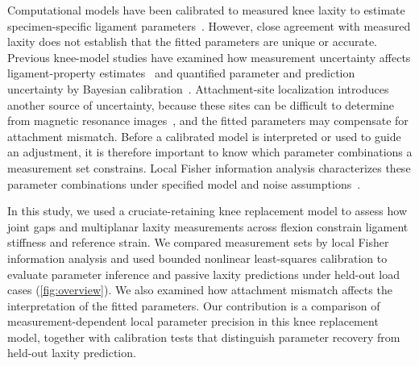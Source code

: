 Computational models have been calibrated to measured knee laxity to estimate specimen-specific ligament parameters~\autocite{harris2016combined,ewing2016estimating}.
However, close agreement with measured laxity does not establish that the fitted parameters are unique or accurate.
Previous knee-model studies have examined how measurement uncertainty affects ligament-property estimates~\autocite{andersen2021measurement} and quantified parameter and prediction uncertainty by Bayesian calibration~\autocite{razu2023bayesian}.
Attachment-site localization introduces another source of uncertainty, because these sites can be difficult to determine from magnetic resonance images~\autocite{rachmat2014generating}, and the fitted parameters may compensate for attachment mismatch.
Before a calibrated model is interpreted or used to guide an adjustment, it is therefore important to know which parameter combinations a measurement set constrains.
Local Fisher information analysis characterizes these parameter combinations under specified model and noise assumptions~\autocite{gutenkunst2007universally,transtrum2015perspective}.

In this study, we used a cruciate-retaining knee replacement model to assess how joint gaps and multiplanar laxity measurements across flexion constrain ligament stiffness and reference strain.
We compared measurement sets by local Fisher information analysis and used bounded nonlinear least-squares calibration to evaluate parameter inference and passive laxity predictions under held-out load cases (\autoref{fig:overview}).
We also examined how attachment mismatch affects the interpretation of the fitted parameters.
Our contribution is a comparison of measurement-dependent local parameter precision in this knee replacement model, together with calibration tests that distinguish parameter recovery from held-out laxity prediction.

